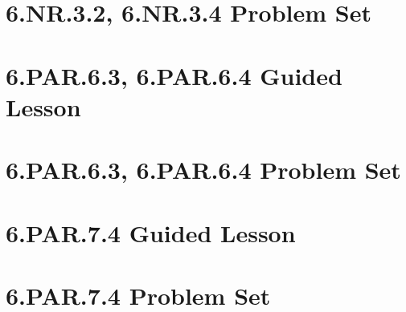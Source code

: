 \documentclass[a4paper,12pt]{article}
\begin{document}
\newpage
\section{6.NR.3.2, 6.NR.3.4 Problem Set}


\newpage
\section{6.PAR.6.3, 6.PAR.6.4 Guided Lesson}


\newpage
\section{6.PAR.6.3, 6.PAR.6.4 Problem Set}


\newpage
\section{6.PAR.7.4 Guided Lesson}


\newpage
\section{6.PAR.7.4 Problem Set}

\end{document}
